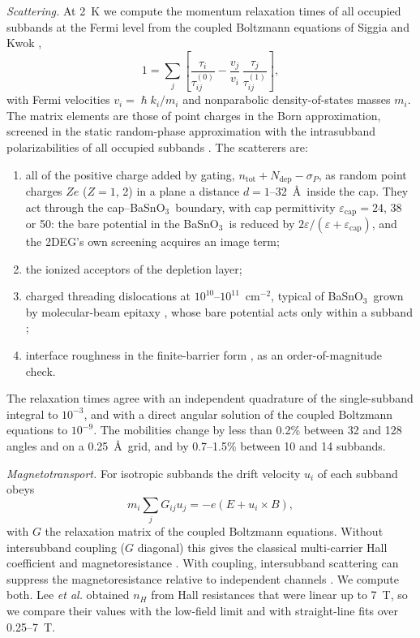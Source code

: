 \documentclass[11pt]{article}
\newcommand{\BSO}{\texorpdfstring{BaSnO$_3$}{BaSnO3}}
\newcommand{\ntot}{n_\mathrm{tot}}
\begin{document}
\emph{Scattering.} At 2~K we compute the momentum relaxation times of all occupied subbands at the Fermi level from the coupled Boltzmann equations of Siggia and Kwok \cite{SiggiaKwok1970},
\begin{equation}
1=\sum_j\left[\frac{\tau_i}{\tau^{(0)}_{ij}}-\frac{v_j}{v_i}\,\frac{\tau_j}{\tau^{(1)}_{ij}}\right],
\end{equation}
with Fermi velocities $v_i=\hslash k_i/m_i$ and nonparabolic density-of-states masses $m_i$. The matrix elements are those of point charges in the Born approximation, screened in the static random-phase approximation with the intrasubband polarizabilities of all occupied subbands \cite{SiggiaKwok1970,AFS1982}. The scatterers are:
\begin{enumerate}
\item all of the positive charge added by gating, $\ntot+N_\mathrm{dep}-\sigma_P$, as random point charges $Ze$ ($Z=1$, 2) in a plane a distance $d=1$--32~\AA\ inside the cap. They act through the cap--\BSO\ boundary, with cap permittivity $\varepsilon_\mathrm{cap}=24$, 38 or 50: the bare potential in the \BSO\ is reduced by $2\varepsilon/(\varepsilon+\varepsilon_\mathrm{cap})$, and the 2DEG's own screening acquires an image term;
\item the ionized acceptors of the depletion layer;
\item charged threading dislocations at $10^{10}$--$10^{11}$~cm$^{-2}$, typical of \BSO\ grown by molecular-beam epitaxy \cite{Paik2017}, whose bare potential acts only within a subband \cite{Jena2000};
\item interface roughness in the finite-barrier form \cite{AFS1982}, as an order-of-magnitude check.
\end{enumerate}
The relaxation times agree with an independent quadrature of the single-subband integral to $10^{-3}$, and with a direct angular solution of the coupled Boltzmann equations to $10^{-9}$. The mobilities change by less than 0.2\% between 32 and 128 angles and on a 0.25~\AA\ grid, and by 0.7--1.5\% between 10 and 14 subbands.

\emph{Magnetotransport.} For isotropic subbands the drift velocity $u_i$ of each subband obeys
\begin{equation}
m_i\sum_jG_{ij}u_j=-e(E+u_i\times B),
\end{equation}
with $G$ the relaxation matrix of the coupled Boltzmann equations. Without intersubband coupling ($G$ diagonal) this gives the classical multi-carrier Hall coefficient and magnetoresistance \cite{Ziman1972}. With coupling, intersubband scattering can suppress the magnetoresistance relative to independent channels \cite{Zaremba1992}. We compute both. Lee \emph{et al.} obtained $n_H$ from Hall resistances that were linear up to 7~T, so we compare their values with the low-field limit and with straight-line fits over 0.25--7~T.
\end{document}
